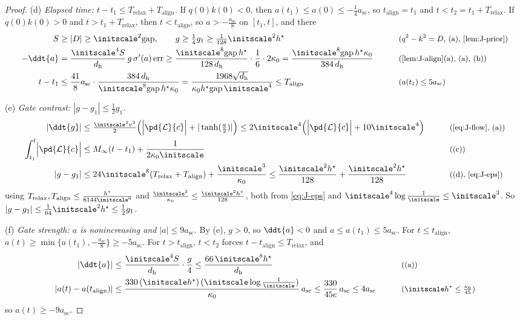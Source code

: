 \begin{proof}
\smallskip\noindent(d) \emph{Elapsed time: $t-t_1\le T_{\mathrm{relax}}+T_{\mathrm{align}}$.} If $q(0)k(0)<0$, then $a(t_1)\le a(0)\le-\frac{1}{4}a_{\mathrm{sc}}$, so
$t_{\mathrm{align}}=t_1$ and $t<t_2=t_1+T_{\mathrm{relax}}$. If $q(0)k(0)>0$ and $t>t_1+T_{\mathrm{relax}}$, then $t<t_{\mathrm{align}}$, so $a>-\frac{a_{\mathrm{sc}}}{8}$ on
$[t_1,t]$, and there
\begin{alignat*}{2}
 S&\ge|D|\ge\initscale^2\mathrm{gap},\qquad g\ge\tfrac{1}{4}g_1\ge\tfrac{1}{128}\initscale^2h^\star &\qquad& \why{$q^2-k^2=D$, (a), \cref{lem:J-prior}}\\
 -\ddt{a}&=\frac{\initscale^4S}{d_{\mathrm h}}\,g\,\sigma'(a)\,\mathrm{err}\ge\frac{\initscale^8\mathrm{gap}\,h^\star}{128\,d_{\mathrm h}}\cdot\frac{1}{6}\cdot2\kappa_0=\frac{\initscale^8\mathrm{gap}\,h^\star\kappa_0}{384\,d_{\mathrm h}} && \why{\cref{lem:J-align}(a), (a), (b)}\\
 t-t_1&\le\frac{41}{8}a_{\mathrm{sc}}\cdot\frac{384\,d_{\mathrm h}}{\initscale^8\mathrm{gap}\,h^\star\kappa_0}=\frac{1968\sqrt{d_{\mathrm h}}}{\kappa_0h^\star\mathrm{gap}\,\initscale^4}\le T_{\mathrm{align}} && \why{$a(t_1)\le5a_{\mathrm{sc}}$}
\end{alignat*}

\noindent(e) \emph{Gate contrast: $|g-g_1|\le\frac{1}{2}g_1$.}
\begin{alignat*}{2}
 |\ddt{g}|&\le\tfrac{\initscale^2v^2}{2}\Bigl(\Bigl|\pd{\mathcal L}{c}\Bigr|+|\tanh(\tfrac{a}{2})|\Bigr)\le2\initscale^4\Bigl(\Bigl|\pd{\mathcal L}{c}\Bigr|+10\initscale^4\Bigr) &\qquad& \why{\cref{eq:J-flow}, (a)}\\
 \int_{t_1}^t\Bigl|\pd{\mathcal L}{c}\Bigr|&\le M_\infty(t-t_1)+\frac{1}{2\kappa_0\initscale} && \why{(c)}\\
 |g-g_1|&\le24\initscale^8(T_{\mathrm{relax}}+T_{\mathrm{align}})+\frac{\initscale^3}{\kappa_0}\le\frac{\initscale^2h^\star}{128}+\frac{\initscale^2h^\star}{128} && \why{(d), \cref{eq:J-eps}}
\end{alignat*}
using $T_{\mathrm{relax}},T_{\mathrm{align}}\le\frac{h^\star}{6144\initscale^6}$ and $\frac{\initscale^3}{\kappa_0}\le\frac{\initscale^2h^\star}{128}$, both from \cref{eq:J-eps} and $\initscale^4\log\frac{1}{\initscale}\le\initscale^3$. So
$|g-g_1|\le\frac{1}{64}\initscale^2h^\star\le\frac{1}{2}g_1$.

\smallskip\noindent(f) \emph{Gate strength: $a$ is nonincreasing and $|a|\le9a_{\mathrm{sc}}$.} By (e), $g>0$, so $\ddt{a}<0$ and $a\le a(t_1)\le5a_{\mathrm{sc}}$. For $t\le t_{\mathrm{align}}$,
$a(t)\ge\min\{a(t_1),-\frac{a_{\mathrm{sc}}}{8}\}\ge-5a_{\mathrm{sc}}$. For $t>t_{\mathrm{align}}$, $t<t_2$ forces $t-t_{\mathrm{align}}\le T_{\mathrm{relax}}$, and
\begin{alignat*}{2}
 |\ddt{a}|&\le\frac{\initscale^4S}{d_{\mathrm h}}\cdot\frac{g}{4}\le\frac{66\,\initscale^8h^\star}{d_{\mathrm h}} &\qquad& \why{(a)}\\
 |a(t)-a(t_{\mathrm{align}})|&\le\frac{330\,(\initscale h^\star)\,(\initscale\log\frac{1}{\initscale})}{\kappa_0}\,a_{\mathrm{sc}}\le\frac{330}{45e}\,a_{\mathrm{sc}}\le4a_{\mathrm{sc}} && \why{$\initscale h^\star\le\tfrac{\kappa_0}{45}$}
\end{alignat*}
so $a(t)\ge-9a_{\mathrm{sc}}$.


\end{proof}
